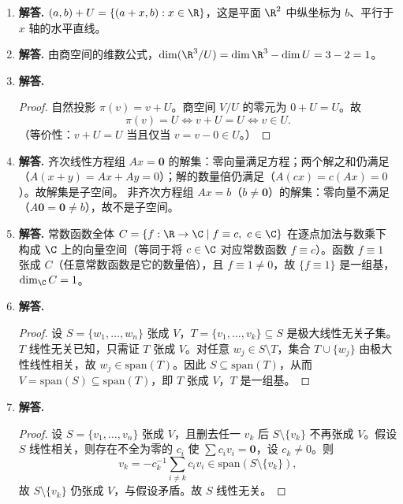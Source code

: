 \begin{enumerate}[label=\textbf{\arabic*.}, leftmargin=*, itemsep=1em]
\item \textbf{解答.}
$(a,b)+U=\{(a+x,b):x\in\R\}$，这是平面 $\R^2$ 中纵坐标为 $b$、平行于 $x$ 轴的水平直线。

\item \textbf{解答.}
由商空间的维数公式，$\dim(\R^3/U)=\dim\R^3-\dim U=3-2=1$。

\item \textbf{解答.}
\begin{proof}
自然投影 $\pi(v)=v+U$。商空间 $V/U$ 的零元为 $0+U=U$。故
\[
\pi(v)=U\iff v+U=U\iff v\in U.
\]
（等价性：$v+U=U$ 当且仅当 $v=v-0\in U$。）
\end{proof}

\item \textbf{解答.}
齐次线性方程组 $Ax=\mathbf{0}$ 的解集：零向量满足方程；两个解之和仍满足（$A(x+y)=Ax+Ay=0$）；解的数量倍仍满足（$A(cx)=c(Ax)=0$）。故解集是子空间。
非齐次方程组 $Ax=b$（$b\ne\mathbf{0}$）的解集：零向量不满足（$A\mathbf{0}=\mathbf{0}\ne b$），故不是子空间。

\item \textbf{解答.}
常数函数全体 $C=\{f:\R\to\C\mid f\equiv c,\ c\in\C\}$ 在逐点加法与数乘下构成 $\C$ 上的向量空间（等同于将 $c\in\C$ 对应常数函数 $f\equiv c$）。函数 $f\equiv 1$ 张成 $C$（任意常数函数是它的数量倍），且 $f\equiv 1\ne 0$，故 $\{f\equiv 1\}$ 是一组基，$\dim_{\C}C=1$。


\item \textbf{解答.}
\begin{proof}
设 $S=\{w_1,\dots,w_n\}$ 张成 $V$，$T=\{v_1,\dots,v_k\}\subseteq S$ 是极大线性无关子集。$T$ 线性无关已知，只需证 $T$ 张成 $V$。对任意 $w_j\in S\setminus T$，集合 $T\cup\{w_j\}$ 由极大性线性相关，故 $w_j\in\mathrm{span}(T)$。因此 $S\subseteq\mathrm{span}(T)$，从而 $V=\mathrm{span}(S)\subseteq\mathrm{span}(T)$，即 $T$ 张成 $V$，$T$ 是一组基。
\end{proof}

\item \textbf{解答.}
\begin{proof}
设 $S=\{v_1,\dots,v_n\}$ 张成 $V$，且删去任一 $v_k$ 后 $S\setminus\{v_k\}$ 不再张成 $V$。假设 $S$ 线性相关，则存在不全为零的 $c_i$ 使 $\sum c_iv_i=\mathbf{0}$，设 $c_k\ne 0$。则
\[
v_k=-c_k^{-1}\sum_{i\ne k}c_iv_i\in\mathrm{span}(S\setminus\{v_k\}),
\]
故 $S\setminus\{v_k\}$ 仍张成 $V$，与假设矛盾。故 $S$ 线性无关。
\end{proof}


\end{enumerate}
